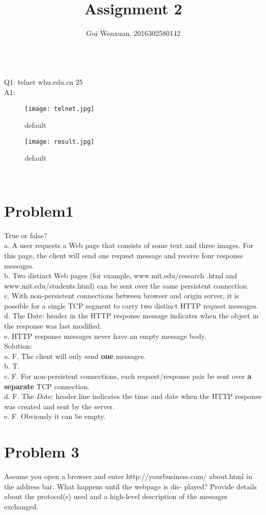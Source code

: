 \documentclass{article}
\author{Gui Wenxuan, 2016302580142}
\title{Assignment 2}
\begin{document}
   \maketitle
   ~\\
   Q1: telnet whu.edu.cn 25\\
   A1: \begin{figure}[ht]
	\centering
	\texttt{[image: telnet.jpg]}
	\caption{default}
	\label{ping}
	\end{figure}
	\begin{figure}[ht]
	\centering
	\texttt{[image: result.jpg]}
	\caption{default}
	\label{ping}
	\end{figure}
	\\
  
\newpage
\section{Problem1} True or false?\\
a. A user requests a Web page that consists of some text and three images. For this page, the client will send one request message and receive four response messages.\\
b. Two distinct Web pages (for example, www.mit.edu/research .html and www.mit.edu/students.html) can be sent over the same persistent connection.\\
c. With non-persistent connections between browser and origin server, it is possible for a single TCP segment to carry two distinct HTTP request messages.\\
d. The Date: header in the HTTP response message indicates when the object in the response was last modified.\\
e. HTTP response messages never have an empty message body.\\


\noindent Solution:\\
a. F. The client will only send {\bfseries one} messages. \\
b. T.\\
c. F. For non-persistent connections, each request/response pair be sent over {\bfseries a separate} TCP connection.\\
d. F. The \emph Date: header line indicates the time and date when the HTTP response was created and sent by the server.\\
e. F. Obviously it can be empty.\\

\newpage
\section{Problem 3} Assume you open a browser and enter http://yourbusiness.com/ about.html in the address bar. What happens until the webpage is dis- played? Provide details about the protocol(s) used and a high-level description of the messages exchanged.\\
\end{document}
